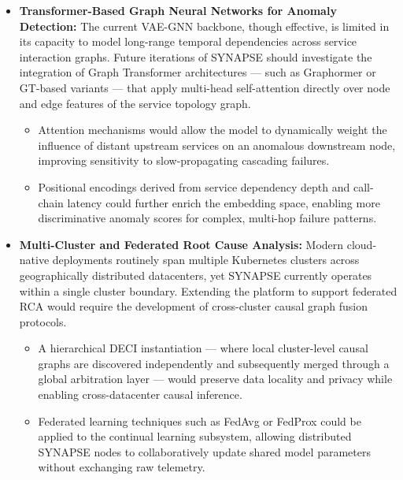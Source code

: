\begin{itemize}

    \item \textbf{Transformer-Based Graph Neural Networks for Anomaly Detection:}
    The current VAE-GNN backbone, though effective, is limited in its capacity to model long-range temporal dependencies across service interaction graphs. Future iterations of SYNAPSE should investigate the integration of Graph Transformer architectures — such as Graphormer or GT-based variants — that apply multi-head self-attention directly over node and edge features of the service topology graph.
    \begin{itemize}
        \item Attention mechanisms would allow the model to dynamically weight the influence of distant upstream services on an anomalous downstream node, improving sensitivity to slow-propagating cascading failures.
        \item Positional encodings derived from service dependency depth and call-chain latency could further enrich the embedding space, enabling more discriminative anomaly scores for complex, multi-hop failure patterns.
    \end{itemize}

    \item \textbf{Multi-Cluster and Federated Root Cause Analysis:}
    Modern cloud-native deployments routinely span multiple Kubernetes clusters across geographically distributed datacenters, yet SYNAPSE currently operates within a single cluster boundary. Extending the platform to support federated RCA would require the development of cross-cluster causal graph fusion protocols.
    \begin{itemize}
        \item A hierarchical DECI instantiation — where local cluster-level causal graphs are discovered independently and subsequently merged through a global arbitration layer — would preserve data locality and privacy while enabling cross-datacenter causal inference.
        \item Federated learning techniques such as FedAvg or FedProx could be applied to the continual learning subsystem, allowing distributed SYNAPSE nodes to collaboratively update shared model parameters without exchanging raw telemetry.
    \end{itemize}


\end{itemize}
